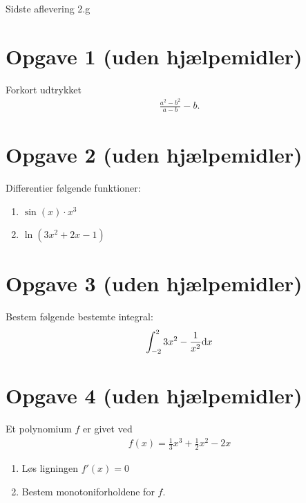 \documentclass[12pt]{article}
\begin{document}
%




\begin{center}
\Huge
Sidste aflevering 2.g
\end{center}
\section*{Opgave 1 (uden hjælpemidler)}
Forkort udtrykket
\begin{align*}
\frac{a^2-b^2}{a-b} -b.
\end{align*}

\section*{Opgave 2 (uden hjælpemidler)}

Differentier følgende funktioner:

\begin{enumerate}[label=\roman*)]
\item $\sin(x)\cdot x^3$
\item $\ln(3x^2+2x-1)$
\end{enumerate}


\section*{Opgave 3 (uden hjælpemidler)}
Bestem følgende bestemte integral:
\begin{align*}
\int_{-2}^2 3x^2 -\frac{1}{x^2} \textnormal{d} x
\end{align*}

\section*{Opgave 4 (uden hjælpemidler)}
Et polynomium $f$ er givet ved
\begin{align*}
f(x) = \frac{1}{3}x^3+\frac{1}{2}x^2-2x
\end{align*} 
\begin{enumerate}[label=\roman*)]
\item Løs ligningen $f'(x) = 0$
\item Bestem monotoniforholdene for $f$.
\end{enumerate}
\end{document}

